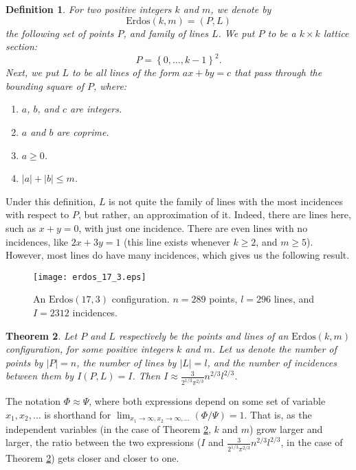\documentclass[11pt]{article}
\newtheorem{theorem}{Theorem}[section]
\newtheorem{definition}[theorem]{Definition}
\newcommand\set[1]{\left\{ #1 \right\}}
\newcommand\Erdos{\mathrm{Erdos}}
\begin{document}
\begin{definition}
For two positive integers $k$ and $m$, we denote by $$\Erdos(k,m) = (P,L)$$
the following set of points $P$, and family of lines $L$.
We put $P$ to be a $k \times k$ lattice section:
\[
P = \set{0, \ldots, k-1}^2.
\]
Next, we put $L$ to be all lines of the form $ax + by = c$ that pass through the
bounding square of $P$, where:
\begin{enumerate}
\item $a$, $b$, and $c$ are integers.
\item $a$ and $b$ are coprime.
\item $a \ge 0$.
\item $|a|+|b| \le m$.
\end{enumerate}
\end{definition}
%
Under this definition, $L$ is not quite the family of lines with the most
incidences with respect to $P$, but rather, an approximation of it.
Indeed, there are lines here, such as $x + y = 0$, with  just one incidence.
There are even lines with no incidences, like $2x + 3y = 1$ (this line exists
whenever $k \ge 2$, and $m \ge 5$).
However, most lines do have many incidences,
which gives us the following result.
%
\begin{figure}
\begin{center}
\texttt{[image: erdos\_17\_3.eps]}
\end{center}
\caption{\sf An $\Erdos(17,3)$ configuration. $n = 289$ points, $l = 296$ lines,
and $I = 2312$ incidences.} \label{fig:erdos}
\end{figure}
%
\begin{theorem} \label{thm:erd}
Let $P$ and $L$ respectively be the points and lines of an $\Erdos(k,m)$
configuration, for some positive integers $k$ and $m$.
Let us denote the number of points by $|P| = n$, the number of lines by
$|L| = l$, and the number of incidences between them by $I(P,L) = I$.
Then $I \approx \frac{3}{2^{1/3}\pi^{2/3}} n^{2/3}l^{2/3}$.
\end{theorem}
%
The notation $\Phi \approx \Psi$, where both expressions depend on some
set of variable $x_1, x_2, \ldots$ is shorthand for
$\lim_{x_1 \to \infty, x_2 \to \infty, \ldots} (\Phi / \Psi) = 1$.
That is, as the independent variables (in the case of Theorem \ref{thm:erd}, $k$
and $m$) grow larger and larger, the ratio between the two expressions ($I$ and
$\frac{3}{2^{1/3}\pi^{2/3}} n^{2/3}l^{2/3}$, in the case of
Theorem \ref{thm:erd}) gets closer and closer to one.
\end{document}
